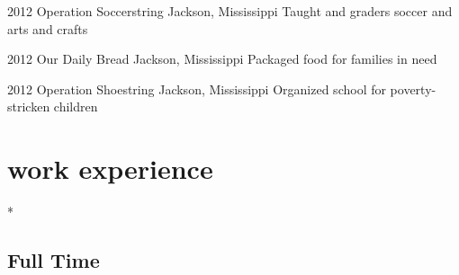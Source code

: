 \documentclass[]{friggeri-cv} %
\begin{document}
\begin{entrylist}
\entry
{2012}
{Operation Soccerstring}
{Jackson, Mississippi}
{Taught  and  graders soccer and arts and crafts}


\entry
{2012}
{Our Daily Bread}
{Jackson, Mississippi}
{Packaged food for families in need}


\entry
{2012}
{Operation Shoestring}
{Jackson, Mississippi}
{Organized school for poverty-stricken children}


\end{entrylist}

\pagebreak 

\section{work experience}

\/*

\subsection{Full Time}
\end{document}
